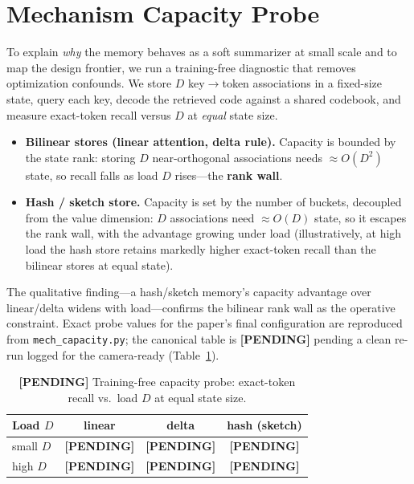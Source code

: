 \documentclass[letterpaper]{article} %
\newcommand{\pending}{\textbf{[PENDING]}}
\begin{document}
\section{Mechanism Capacity Probe}
\label{sec:probe}
To explain \emph{why} the memory behaves as a soft summarizer at small scale and to map the design frontier, we run a training-free diagnostic that removes optimization confounds. We store $D$ key$\rightarrow$token associations in a fixed-size state, query each key, decode the retrieved code against a shared codebook, and measure exact-token recall versus $D$ at \emph{equal} state size.

\begin{itemize}
  \item \textbf{Bilinear stores (linear attention, delta rule).} Capacity is bounded by the state rank: storing $D$ near-orthogonal associations needs $\approx O(D^2)$ state, so recall falls as load $D$ rises---the \textbf{rank wall}.
  \item \textbf{Hash / sketch store.} Capacity is set by the number of buckets, decoupled from the value dimension: $D$ associations need $\approx O(D)$ state, so it escapes the rank wall, with the advantage growing under load (illustratively, at high load the hash store retains markedly higher exact-token recall than the bilinear stores at equal state).
\end{itemize}

The qualitative finding---a hash/sketch memory's capacity advantage over linear/delta widens with load---confirms the bilinear rank wall as the operative constraint. Exact probe values for the paper's final configuration are reproduced from \texttt{mech\_capacity.py}; the canonical table is \pending{} pending a clean re-run logged for the camera-ready (Table~\ref{tab:probe}).

\begin{table}[t]
\centering
\caption{\pending{} Training-free capacity probe: exact-token recall vs.\ load $D$ at equal state size.}
\label{tab:probe}
\begin{tabular}{lccc}
\toprule
Load $D$ & linear & delta & hash (sketch) \\
\midrule
small $D$ & \pending & \pending & \pending \\
high $D$  & \pending & \pending & \pending \\
\bottomrule
\end{tabular}
\end{table}
\end{document}
